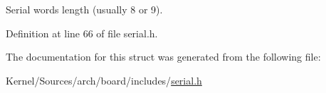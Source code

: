 Serial word\textquotesingle{}s length (usually 8 or 9). 



Definition at line 66 of file serial.\+h.



The documentation for this struct was generated from the following file\+:\begin{DoxyCompactItemize}
\item 
Kernel/\+Sources/arch/board/includes/\hyperlink{serial_8h}{serial.\+h}\end{DoxyCompactItemize}
